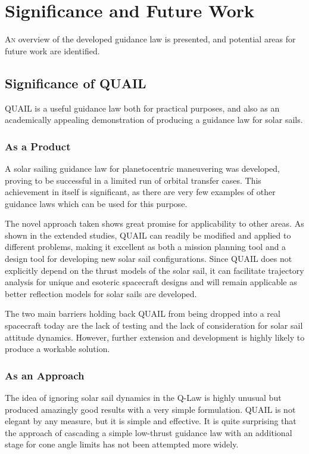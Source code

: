 \chapter{Significance and Future Work}

\lettrine{A}{n} overview of the developed guidance law is presented, and potential areas for future work are identified.

\section{Significance of QUAIL}
QUAIL is a useful guidance law both for practical purposes, and also as an academically appealing demonstration of producing a guidance law for solar sails.

\subsection{As a Product}
A solar sailing guidance law for planetocentric maneuvering was developed, proving to be successful in a limited run of orbital transfer cases. This achievement in itself is significant, as there are very few examples of other guidance laws which can be used for this purpose.

The novel approach taken shows great promise for applicability to other areas. As shown in the extended studies, QUAIL can readily be modified and applied to different problems, making it excellent as both a mission planning tool and a design tool for developing new solar sail configurations. Since QUAIL does not explicitly depend on the thrust models of the solar sail, it can facilitate trajectory analysis for unique and esoteric spacecraft designs and will remain applicable as better reflection models for solar sails are developed.

The two main barriers holding back QUAIL from being dropped into a real spacecraft today are the lack of testing and the lack of consideration for solar sail attitude dynamics. However, further extension and development is highly likely to produce a workable solution.

\subsection{As an Approach}
The idea of ignoring solar sail dynamics in the Q-Law is highly unusual but produced amazingly good results with a very simple formulation. QUAIL is not elegant by any measure, but it is simple and effective. It is quite surprising that the approach of cascading a simple low-thrust guidance law with an additional stage for cone angle limits has not been attempted more widely.

